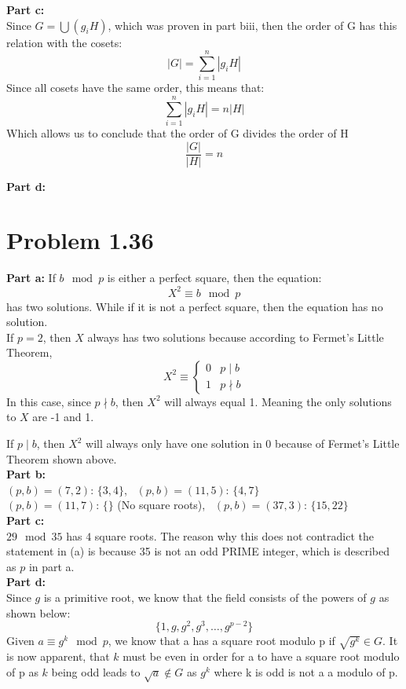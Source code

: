 \documentclass[10pt]{amsart}
\begin{document}
\begin{addmargin}{5pt}
\noindent 
\textbf{\large Part c:} \\
Since $G = \bigcup(g_{i}H)$, which was proven in part biii, then the order of 
G has this relation with the cosets:
\[|G| = \sum_{i = 1}^{n}|g_{i}H|\]
Since all cosets have the same order, this means that:
\[\sum_{i = 1}^{n}|g_{i}H| = n|H|\]
Which allows us to conclude that the order of G divides the order of H
\[\frac{|G|}{|H|} = n\]

\noindent 
\textbf{\large Part d:}
\end{addmargin}

\section*{\large \textbf{Problem 1.36}}
\begin{addmargin}{5pt}

\noindent \textbf{\large Part a:} If $b \mod p$ is either a perfect square, then
the equation:
\[X^2 \equiv b \mod p\]
has two solutions. While if it is not a perfect square, then the equation has
no solution. \\
\noindent If $p = 2$, then $X$ always has two solutions because according to Fermet's 
Little Theorem, 
\[X^2 \equiv 
\begin{cases}
   0 & p \mid  b \\
   1 & p \nmid b 
\end{cases}
\]
In this case, since $p \nmid b$, then $X^2$ will always equal 1. Meaning the
only solutions to $X$ are -1 and 1. 

\noindent If $p \mid b$, then $X^2$ will always only have one solution in $0$ because
of Fermet's Little Theorem shown above. \\

\noindent \textbf{\large Part b:} \\
$(p,b) = (7,2)$: $\{3,4\}$, \  $(p,b) = (11,5)$: $\{4, 7\}$ \\
$(p,b) = (11,7)$: $\{\}$ (No square roots), \ $(p,b) = (37,3)$: $\{15, 22\}$
\\

\noindent \textbf{\large Part c: } \\
$29 \mod 35$ has $4$ square roots. The reason why this does not contradict 
the statement in (a) is because 35 is not an odd PRIME integer, which is 
described as $p$ in part a. \\

\noindent \textbf{\large Part d:} \\
Since $g$ is a primitive root, we know that the field consists of the powers
of $g$ as shown below:
\[\{1,g,g^2,g^3,\ldots, g^{p-2}\}\] 
Given $a \equiv g^k \mod p$, we know that a has a square root modulo p if 
$ \sqrt{g^k} \in G$.
It is now apparent, that $k$ must be even in order for a to have a square root 
modulo of p as $k$ being odd leads to $ \sqrt{a} \notin G$ as $g^k$ where k is
odd is not a a modulo of p. 

\end{addmargin}
\end{document}

